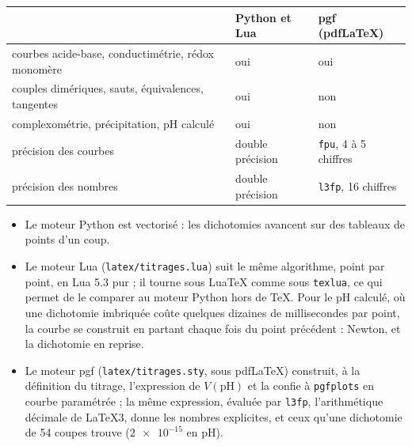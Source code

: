 \documentclass[a4paper,11pt]{article}
\newcommand\pH{\ensuremath{\mathrm{pH}}\xspace}
\newcommand\code[1]{\texttt{#1}}
\begin{document}
\begin{center}
\begin{tabularx}{\linewidth}{@{}>{\raggedright\arraybackslash}X>{\raggedright\arraybackslash}p{.27\linewidth}>{\raggedright\arraybackslash}p{.22\linewidth}@{}}
\toprule
& Python et Lua & pgf (pdf\LaTeX)\\
\midrule
courbes acide-base, conductimétrie, rédox monomère & oui & oui \\
couples dimériques, sauts, équivalences, tangentes & oui & non \\
complexométrie, précipitation, pH calculé & oui & non \\
précision des courbes & double précision & \code{fpu}, 4 à 5 chiffres \\
précision des nombres & double précision & \code{l3fp}, 16 chiffres \\
\bottomrule
\end{tabularx}
\end{center}
\begin{itemize}
\item Le moteur Python est vectorisé : les dichotomies avancent sur des tableaux de points d'un coup.
\item Le moteur Lua (\code{latex/titrages.lua}) suit le même algorithme, point par point, en Lua 5.3 pur ; il tourne sous Lua\TeX{} comme sous \code{texlua}, ce qui permet de le comparer au moteur Python hors de \TeX.
Pour le pH calculé, où une dichotomie imbriquée coûte quelques dizaines de millisecondes par point, la courbe se construit en partant chaque fois du point précédent : Newton, et la dichotomie en reprise.
\item Le moteur pgf (\code{latex/titrages.sty}, sous pdf\LaTeX) construit, à la définition du titrage, l'expression de $V(\pH)$ et la confie à \code{pgfplots} en courbe paramétrée ; la même expression, évaluée par \code{l3fp}, l'arithmétique décimale de \LaTeX3, donne les nombres explicites, et ceux qu'une dichotomie de 54 coupes trouve ($\num{2e-15}$ en \pH).
\end{itemize}
\end{document}
